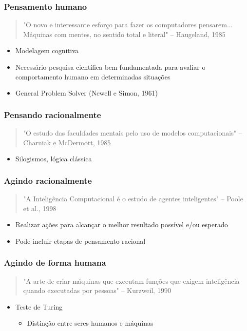 \documentclass[aspectratio=169]{beamer}
\begin{document}
	\begin{frame}
		\frametitle{Pensamento humano}
		\begin{quote}
		"O novo e interessante esforço para fazer os computadores pensarem... Máquinas com mentes, no sentido total e literal" – Haugeland, 1985
		\end{quote}
		\begin{itemize}
			
			\item Modelagem cognitiva
			
			\item Necessário pesquisa científica bem fundamentada para avaliar o comportamento humano em determinadas situações
			
			\item General Problem Solver (Newell e Simon, 1961)
		
		\end{itemize}
	\end{frame}	

	\begin{frame}
		\frametitle{Pensando racionalmente}
		\begin{quote}
			"O estudo das faculdades mentais pelo uso de modelos computacionais" – Charniak e McDermott, 1985
		\end{quote}
		
		\begin{itemize}
			\item Silogismos, lógica clássica
		\end{itemize}
	\end{frame}

	\begin{frame}
		\frametitle{Agindo racionalmente}
		\begin{quote}
			"A Inteligência Computacional é o estudo de agentes inteligentes" – Poole et al., 1998
		\end{quote}
		
		\begin{itemize}
			\item Realizar ações para alcançar o melhor resultado possível e/ou esperado

			\item Pode incluir etapas de pensamento racional
		\end{itemize}
	\end{frame}

	\begin{frame}
		\frametitle{Agindo de forma humana}
		\begin{quote}
			"A arte de criar máquinas que executam funções que exigem inteligência quando executadas por pessoas" – Kurzweil, 1990
		\end{quote}
		
		\begin{itemize}
			\item Teste de Turing
			\begin{itemize}
				\item Distinção entre seres humanos e máquinas
			\end{itemize}
		\end{itemize}
	\end{frame}
	
\end{document}
